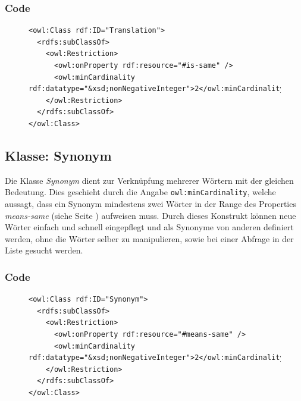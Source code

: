 \documentclass[
    11pt,
    latin1,
    a4paper,
    oneside
]{scrreprt}
\let\oldemph=\emph
\renewcommand{\emph}[1]{\index{#1}\oldemph{#1}}
\begin{document}
\subsubsection{Code}  \label{sec:class_translation_code}

\begin{figure}[H]
 \lstset{language=XML}
 \begin{lstlisting}[label=owl:translation,caption={Die Klasse \emph{Translation} beinhaltet alle \"Ubersetzungen eines Wortes}]
<owl:Class rdf:ID="Translation">
  <rdfs:subClassOf>
    <owl:Restriction>
      <owl:onProperty rdf:resource="#is-same" />
      <owl:minCardinality rdf:datatype="&xsd;nonNegativeInteger">2</owl:minCardinality>
    </owl:Restriction>
  </rdfs:subClassOf>
</owl:Class>
 \end{lstlisting}
\end{figure}


\subsection{Klasse: Synonym} \label{sec:class_synonym}

Die Klasse \emph{Synonym} dient zur Verkn\"upfung mehrerer W\"ortern mit der gleichen Bedeutung. Dies geschieht durch die Angabe \texttt{owl:minCardinality}, welche aussagt, dass ein Synonym mindestens zwei W\"orter in der Range des Properties \emph{means-same} (siehe  Seite \pageref{sec:rel_meanssame}) aufweisen muss. Durch dieses Konstrukt k\"onnen neue W\"orter einfach und schnell eingepflegt und als Synonyme von anderen definiert werden, ohne die W\"orter selber zu manipulieren, sowie bei einer Abfrage in der Liste gesucht werden.

\subsubsection{Code}  \label{sec:class_synonym_code}

\begin{figure}[H]
 \lstset{language=XML}
 \begin{lstlisting}[label=owl:synonym,caption={Die Klasse \emph{Synonym} beinhaltet alle W\"orter dir etwas \"ahnliches bedeuten}]
<owl:Class rdf:ID="Synonym">
  <rdfs:subClassOf>
    <owl:Restriction>
      <owl:onProperty rdf:resource="#means-same" />
      <owl:minCardinality rdf:datatype="&xsd;nonNegativeInteger">2</owl:minCardinality>
    </owl:Restriction>
  </rdfs:subClassOf>
</owl:Class>
 \end{lstlisting}
\end{figure}
\end{document}
